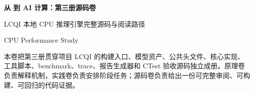 \begin{titlepage}
\thispagestyle{empty}
\vspace*{2.2cm}
{\Huge\bfseries\color{BookNavy} 从 \cpp 到 AI 计算：第三册源码卷\par}
\vspace{0.68cm}
{\Large\color{BookAccent} LCQI 本地 CPU 推理引擎完整源码与阅读路径\par}
\vspace{1.25cm}
{\large CPU Performance Study\par}
\vfill
{\small\color{BookMuted} 本卷把第三册贯穿项目 LCQI 的构建入口、模型资产、公共头文件、核心实现、工具脚本、benchmark、trace、报告生成器和 CTest 验收源码独立成册。原理卷负责解释机制，实践卷负责安排阶段任务；源码卷负责给出一份可完整审阅、可构建、可回归的代码证据。\par}
\end{titlepage}
